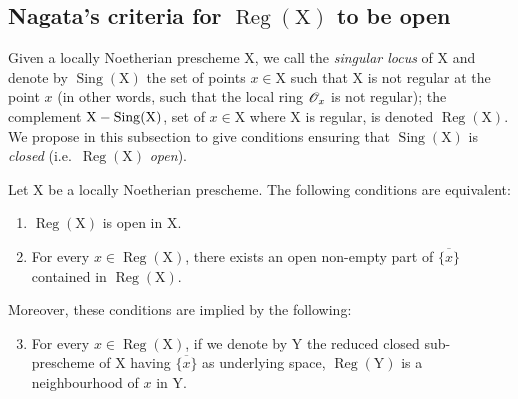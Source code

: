 \subsection{Nagata's criteria for \texorpdfstring{$\operatorname{Reg}(\mathrm{X})$}{Reg(X)} to be open}
\label{subsection:IV.6.12}
\label{IV.6.12}

\begin{env}[6.12.1]
\label{IV.6.12.1}
Given a locally Noetherian prescheme $\mathrm{X}$, we call the \emph{singular
locus} of $\mathrm{X}$ and denote by $\operatorname{Sing}(\mathrm{X})$ the set of points $x\in\mathrm{X}$ such that $\mathrm{X}$ is not
regular at the point $x$ (in other words, such that the local ring $\mathscr{O}_x$ is not regular); the
complement $\mathrm{X}-\operatorname{Sing}(\mathrm{X})$, set of $x\in\mathrm{X}$ where $\mathrm{X}$ is regular, is denoted $\operatorname{Reg}(\mathrm{X})$.
We propose in this subsection to give conditions ensuring that
$\operatorname{Sing}(\mathrm{X})$ is \emph{closed} (i.e.\ $\operatorname{Reg}(\mathrm{X})$ \emph{open}).
\end{env}

\begin{proposition}[6.12.2]
\label{IV.6.12.2}
Let $\mathrm{X}$ be a locally Noetherian prescheme. The following conditions
are equivalent:
\begin{enumerate}[label=\emph{\alph*)}]
  \item $\operatorname{Reg}(\mathrm{X})$ is open in $\mathrm{X}$.
  \item For every $x\in\operatorname{Reg}(\mathrm{X})$, there exists an open non-empty part of $\overline{\{x\}}$ contained in $\operatorname{Reg}(\mathrm{X})$.
\end{enumerate}
Moreover, these conditions are implied by the following:
\begin{enumerate}[label=\emph{\alph*)}]
\setcounter{enumi}{2}
  \item For every $x\in\operatorname{Reg}(\mathrm{X})$, if we denote by $\mathrm{Y}$ the reduced closed sub-prescheme of $\mathrm{X}$ having $\overline{\{x\}}$
as underlying space, $\operatorname{Reg}(\mathrm{Y})$ is a neighbourhood of $x$ in $\mathrm{Y}$.
\end{enumerate}
\end{proposition}

